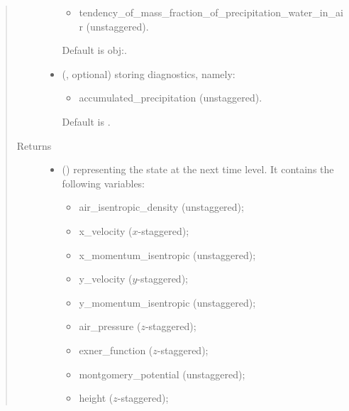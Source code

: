 \documentclass[letterpaper,10pt,english]{sphinxmanual}
\begin{document}
\begin{fulllineitems}
\begin{fulllineitems}
\begin{quote}
\begin{description}
\begin{itemize}
\begin{itemize}
\item {} 
tendency\_of\_mass\_fraction\_of\_precipitation\_water\_in\_air (unstaggered).

\end{itemize}

Default is obj:.


\item {} 
 (, optional) \textendash{} 
{\hyperref[\detokenize{api:storages.grid_data.GridData}]{}} storing diagnostics, namely:
\begin{itemize}
\item {} 
accumulated\_precipitation (unstaggered).

\end{itemize}

Default is .


\end{itemize}

\item[{Returns}] \leavevmode
\begin{itemize}
\item {} 
 () \textendash{} {\hyperref[\detokenize{api:storages.state_isentropic.StateIsentropic}]{}} representing the state at the next time level.
It contains the following variables:
\begin{itemize}
\item {} 
air\_isentropic\_density (unstaggered);

\item {} 
x\_velocity (\(x\)-staggered);

\item {} 
x\_momentum\_isentropic (unstaggered);

\item {} 
y\_velocity (\(y\)-staggered);

\item {} 
y\_momentum\_isentropic (unstaggered);

\item {} 
air\_pressure (\(z\)-staggered);

\item {} 
exner\_function (\(z\)-staggered);

\item {} 
montgomery\_potential (unstaggered);

\item {} 
height (\(z\)-staggered);


\end{itemize}
\end{itemize}
\end{description}
\end{quote}
\end{fulllineitems}
\end{fulllineitems}
\end{document}
